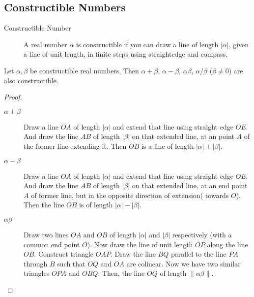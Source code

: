 \subsection{Constructible Numbers}
\begin{description}
	\item[Constructible Number] A real number $\alpha$ is constructible if you can draw a line of length $|\alpha|$, given a line of unit length, in finite steps using straightedge and compass.
\end{description}
\begin{theorem}
	Let $\alpha,\beta$ be constructible real numbers. Then $\alpha + \beta$, $\alpha-\beta$, $\alpha\beta$, $\alpha/\beta$ ($\beta \ne 0$) are also constructible.
\end{theorem}
\begin{proof}
\begin{description}
	\item[$\alpha+\beta$] Draw a line $OA$ of length $|\alpha|$ and extend that line using straight edge $OE$. And draw the line $AB$ of length $|\beta|$ on that extended line, at an point $A$ of the former line extending it. Then $OB$ is a line of length $|\alpha| + |\beta|$.
\begin{center}
\end{center}
	\item[$\alpha-\beta$] Draw a line $OA$ of length $|\alpha|$ and extend that line using straight edge $OE$. And draw the line $AB$ of length $|\beta|$ on that extended line, at an end point $A$ of former line, but in the opposite direction of extension( towards $O$). Then the line $OB$ is of length $|\alpha|-|\beta|$.
\begin{center}
\end{center}
	\item[$\alpha\beta$] Draw two lines $OA$ and $OB$ of length $|\alpha|$ and $|\beta|$ respectively (with a common end point $O$). Now draw the line of unit length $OP$ along the line $OB$. Construct triangle $OAP$. Draw the line $BQ$ parallel to the line $PA$ through $B$ such that $OQ$ and $OA$ are colinear. Now we have two similar triangles $OPA$ and $OBQ$. Then, the line $OQ$ of length $\| \alpha \beta \|$.

\end{description}
\end{proof}
